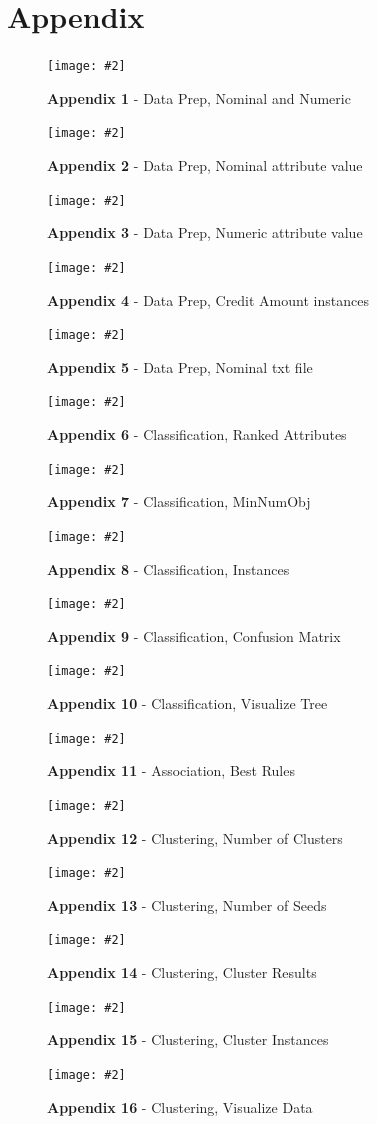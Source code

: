 \documentclass[12pt, a4paper]{article}
\newcommand{\figuremacro}[5]{
    \begin{figure}[#1]
        \centering
        \texttt{[image: \#2]}
        \caption[#3]{\textbf{#3}#4}
        \label{fig:#2}
    \end{figure}
}
\begin{document}
	\section{Appendix}
	\figuremacro{h}{appendix1}{Appendix 1}{ - Data Prep, Nominal and Numeric}{1.0}
	\figuremacro{h}{appendix2}{Appendix 2}{ - Data Prep, Nominal attribute value}{1.0}
	\figuremacro{h}{appendix3}{Appendix 3}{ - Data Prep, Numeric attribute value}{1.0}
	\figuremacro{h}{appendix4}{Appendix 4}{ - Data Prep, Credit Amount instances}{1.0}
	\figuremacro{h}{appendix5}{Appendix 5}{ - Data Prep, Nominal txt file}{1.0}
	\figuremacro{h}{appendix6}{Appendix 6}{ - Classification, Ranked Attributes}{1.0}
	\figuremacro{h}{appendix7}{Appendix 7}{ - Classification, MinNumObj}{1.0}
	\figuremacro{h}{appendix8}{Appendix 8}{ - Classification, Instances}{1.0}
	\figuremacro{h}{appendix9}{Appendix 9}{ - Classification, Confusion Matrix}{1.0}
	\figuremacro{h}{appendix10}{Appendix 10}{ - Classification, Visualize Tree}{2.0}
	\figuremacro{h}{appendix11}{Appendix 11}{ - Association, Best Rules}{1.0}
	\figuremacro{h}{appendix12}{Appendix 12}{ - Clustering, Number of Clusters}{1.0}
	\figuremacro{h}{appendix13}{Appendix 13}{ - Clustering, Number of Seeds}{1.0}
	\figuremacro{h}{appendix14}{Appendix 14}{ - Clustering, Cluster Results}{1.0}
	\figuremacro{h}{appendix15}{Appendix 15}{ - Clustering, Cluster Instances}{1.0}
	\figuremacro{h}{appendix16}{Appendix 16}{ - Clustering, Visualize Data}{1.0}
	
	
	


		
\end{document}
